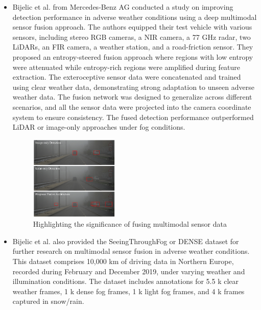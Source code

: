 \documentclass[rnd]{mas_proposal}
\begin{document}
\begin{itemize}
      \item Bijelic et al. \cite{bijelic2020seeing} from Mercedes-Benz AG conducted a study on improving detection performance in adverse weather conditions using a deep multimodal sensor fusion approach. The authors equipped their test vehicle with various sensors, including stereo RGB cameras, a NIR camera, a 77 GHz radar, two LiDARs, an FIR camera, a weather station, and a road-friction sensor. They proposed an entropy-steered fusion approach where regions with low entropy were attenuated while entropy-rich regions were amplified during feature extraction. The exteroceptive sensor data were concatenated and trained using clear weather data, demonstrating strong adaptation to unseen adverse weather data. The fusion network was designed to generalize across different scenarios, and all the sensor data were projected into the camera coordinate system to ensure consistency. The fused detection performance outperformed LiDAR or image-only approaches under fog conditions.
            \begin{figure}[h]
                  \centering
                  \includegraphics[width=0.4\textwidth]{images/seeing_through_fog.png}
                  \caption{Highlighting the significance of fusing multimodal sensor data \cite{bijelic2020seeing}}
                  \label{fig:seeing_through_fog}
            \end{figure}
      \item Bijelic et al. \cite{bijelic2020seeing} also provided the SeeingThroughFog or DENSE dataset for further research on multimodal sensor fusion in adverse weather conditions. This dataset comprises 10,000 km of driving data in Northern Europe, recorded during February and December 2019, under varying weather and illumination conditions. The dataset includes annotations for 5.5 k clear weather frames, 1 k dense fog frames, 1 k light fog frames, and 4 k frames captured in snow/rain.

\end{itemize}
\end{document}
